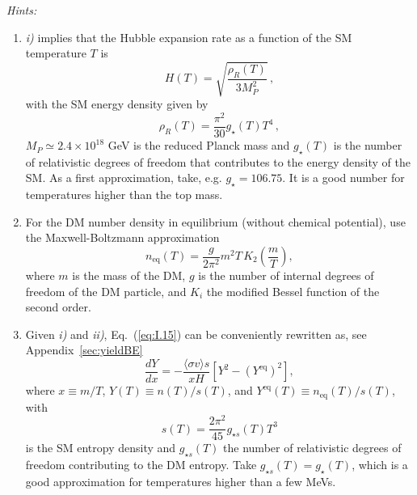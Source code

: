 \documentclass[11pt,a4paper]{article}
\begin{document}
\vspace{0.5cm}
\noindent \textit{Hints:}
\begin{enumerate}
    \item \textit{i)} implies that the Hubble expansion rate as a function of the SM temperature $T$ is
    \begin{equation} \label{eq:I.16}
        H(T) = \sqrt{\frac{\rho_R(T)}{3 M_P^2}} \, ,
    \end{equation}
    with the SM energy density given by
    \begin{equation} \label{eq:I.17}
        \rho_R(T) = \frac{\pi^2}{30} g_\star(T) T^4 \, ,
    \end{equation}
    $M_P \simeq 2.4 \times 10^{18}$ GeV is the reduced Planck mass and $g_\star(T)$ is the number of relativistic degrees of freedom that contributes to the energy density of the SM. As a first approximation, take, e.g. $g_\star = 106.75$. It is a good number for temperatures higher than the top mass.
    
    \item For the DM number density in equilibrium (without chemical potential), use the Maxwell-Boltzmann approximation
    \begin{equation} \label{eq:I.18}
        n_{\text{eq}}(T) = \frac{g}{2\pi^2} m^2 T \, K_2\left(\frac{m}{T}\right),
    \end{equation}
    where $m$ is the mass of the DM, $g$ is the number of internal degrees of freedom of the DM particle, and $K_i$ the modified Bessel function of the second order.
    
    \item Given \textit{i)} and \textit{ii)}, Eq.~(\ref{eq:I.15}) can be conveniently rewritten as, see Appendix~\ref{sec:yieldBE}
    \begin{equation} \label{eq:I.19}
        \frac{dY}{dx} = -\frac{\langle \sigma v \rangle s}{x H} \left[ Y^2 - (Y^{\text{eq}})^2 \right],
    \end{equation}
    where $x \equiv m/T$, $Y(T) \equiv n(T)/s(T)$, and $Y^{\text{eq}}(T) \equiv n_{\text{eq}}(T)/s(T)$, with
    \begin{equation} \label{eq:I.20}
        s(T) = \frac{2\pi^2}{45} g_{\star s}(T) T^3
    \end{equation}
    is the SM entropy density and $g_{\star s}(T)$ the number of relativistic degrees of freedom contributing to the DM entropy. Take $g_{\star s}(T) = g_\star(T)$, which is a good approximation for temperatures higher than a few MeVs.
    

\end{enumerate}
\end{document}
